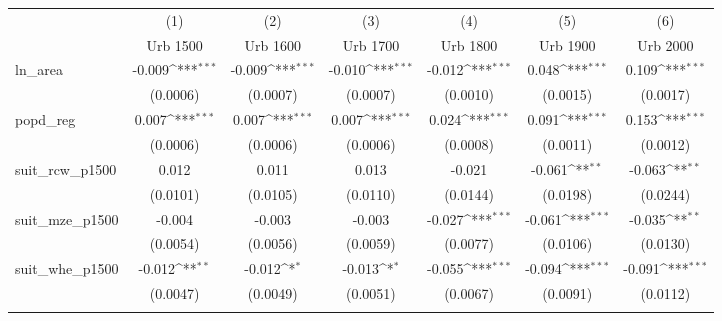 {
\def\sym#1{\ifmmode^{#1}\else\(^{#1}\)\fi}
\begin{tabular}{l*{6}{c}}
\toprule
                    &\multicolumn{1}{c}{(1)}&\multicolumn{1}{c}{(2)}&\multicolumn{1}{c}{(3)}&\multicolumn{1}{c}{(4)}&\multicolumn{1}{c}{(5)}&\multicolumn{1}{c}{(6)}\\
                    &\multicolumn{1}{c}{Urb 1500}&\multicolumn{1}{c}{Urb 1600}&\multicolumn{1}{c}{Urb 1700}&\multicolumn{1}{c}{Urb 1800}&\multicolumn{1}{c}{Urb 1900}&\multicolumn{1}{c}{Urb 2000}\\
\midrule
ln\_area             &      -0.009\sym{***}&      -0.009\sym{***}&      -0.010\sym{***}&      -0.012\sym{***}&       0.048\sym{***}&       0.109\sym{***}\\
                    &    (0.0006)         &    (0.0007)         &    (0.0007)         &    (0.0010)         &    (0.0015)         &    (0.0017)         \\
\addlinespace
popd\_reg            &       0.007\sym{***}&       0.007\sym{***}&       0.007\sym{***}&       0.024\sym{***}&       0.091\sym{***}&       0.153\sym{***}\\
                    &    (0.0006)         &    (0.0006)         &    (0.0006)         &    (0.0008)         &    (0.0011)         &    (0.0012)         \\
\addlinespace
suit\_rcw\_p1500      &       0.012         &       0.011         &       0.013         &      -0.021         &      -0.061\sym{**} &      -0.063\sym{**} \\
                    &    (0.0101)         &    (0.0105)         &    (0.0110)         &    (0.0144)         &    (0.0198)         &    (0.0244)         \\
\addlinespace
suit\_mze\_p1500      &      -0.004         &      -0.003         &      -0.003         &      -0.027\sym{***}&      -0.061\sym{***}&      -0.035\sym{**} \\
                    &    (0.0054)         &    (0.0056)         &    (0.0059)         &    (0.0077)         &    (0.0106)         &    (0.0130)         \\
\addlinespace
suit\_whe\_p1500      &      -0.012\sym{**} &      -0.012\sym{*}  &      -0.013\sym{*}  &      -0.055\sym{***}&      -0.094\sym{***}&      -0.091\sym{***}\\
                    &    (0.0047)         &    (0.0049)         &    (0.0051)         &    (0.0067)         &    (0.0091)         &    (0.0112)         \\
\addlinespace

\end{tabular}}
